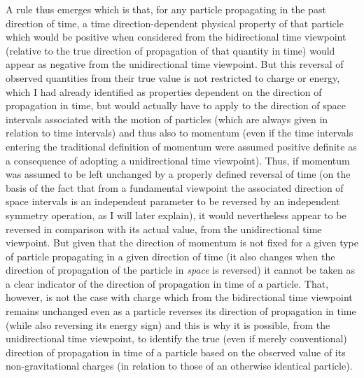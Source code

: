 \documentclass[notitlepage,12pt]{report}
\begin{document}
A rule thus emerges which is that, for any particle propagating in the past direction of time, a time direction-dependent physical property of that particle which would be positive when considered from the bidirectional time viewpoint (relative to the true direction of propagation of that quantity in time) would appear as negative from the unidirectional time viewpoint. But this reversal of observed quantities from their true value is not restricted to charge or energy, which I had already identified as properties dependent on the direction of propagation in time, but would actually have to apply to the direction of space intervals associated with the motion of particles (which are always given in relation to time intervals) and thus also to momentum (even if the time intervals entering the traditional definition of momentum were assumed positive definite as a consequence of adopting a unidirectional time viewpoint). Thus, if momentum was assumed to be left unchanged by a properly defined reversal of time (on the basis of the fact that from a fundamental viewpoint the associated direction of space intervals is an independent parameter to be reversed by an independent symmetry operation, as I will later explain), it would nevertheless appear to be reversed in comparison with its actual value, from the unidirectional time viewpoint. But given that the direction of momentum is not fixed for a given type of particle propagating in a given direction of time (it also changes when the direction of propagation of the particle in \textit{space} is reversed) it cannot be taken as a clear indicator of the direction of propagation in time of a particle. That, however, is not the case with charge which from the bidirectional time viewpoint remains unchanged even as a particle reverses its direction of propagation in time (while also reversing its energy sign) and this is why it is possible, from the unidirectional time viewpoint, to identify the true (even if merely conventional) direction of propagation in time of a particle based on the observed value of its non-gravitational charges (in relation to those of an otherwise identical particle).
\end{document}
